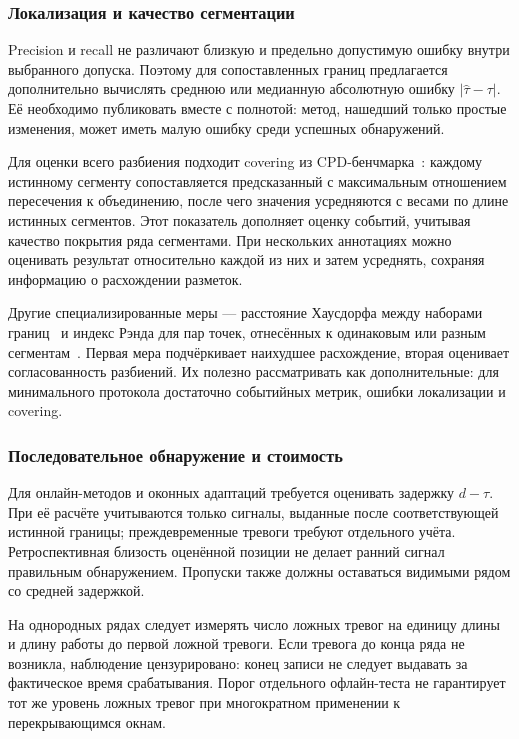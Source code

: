 \subsubsection{Локализация и качество сегментации}

Precision и recall не различают близкую и предельно допустимую
ошибку внутри выбранного допуска. Поэтому для сопоставленных
границ предлагается дополнительно вычислять среднюю или медианную
абсолютную ошибку $|\hat\tau-\tau|$. Её необходимо публиковать
вместе с полнотой: метод, нашедший только простые изменения,
может иметь малую ошибку среди успешных обнаружений.

Для оценки всего разбиения подходит covering из
CPD-бенчмарка~\cite{vandenburg2022}: каждому истинному сегменту
сопоставляется предсказанный с максимальным отношением пересечения
к объединению, после чего значения усредняются с весами по длине
истинных сегментов. Этот показатель дополняет оценку событий,
учитывая качество покрытия ряда сегментами. При нескольких
аннотациях можно оценивать результат относительно каждой из них
и затем усреднять, сохраняя информацию о расхождении разметок.

Другие специализированные меры --- расстояние Хаусдорфа между
наборами границ~\cite{hausdorff} и индекс Рэнда для пар точек,
отнесённых к одинаковым или разным сегментам~\cite{randindex}.
Первая мера подчёркивает наихудшее расхождение, вторая оценивает
согласованность разбиений. Их полезно рассматривать как дополнительные:
для минимального протокола достаточно событийных метрик,
ошибки локализации и covering.

\subsubsection{Последовательное обнаружение и стоимость}

Для онлайн-методов и оконных адаптаций требуется оценивать
задержку $d-\tau$. При её расчёте учитываются только сигналы,
выданные после соответствующей истинной границы; преждевременные
тревоги требуют отдельного учёта. Ретроспективная близость
оценённой позиции не делает ранний сигнал правильным обнаружением.
Пропуски также должны оставаться видимыми рядом со средней задержкой.

На однородных рядах следует измерять число ложных тревог
на единицу длины и длину работы до первой ложной тревоги.
Если тревога до конца ряда не возникла, наблюдение цензурировано:
конец записи не следует выдавать за фактическое время срабатывания.
Порог отдельного офлайн-теста не гарантирует тот же уровень
ложных тревог при многократном применении к перекрывающимся окнам.

